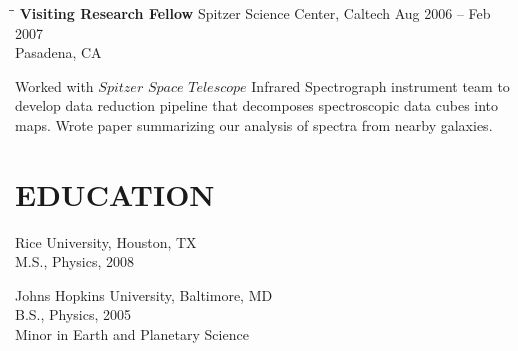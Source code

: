\documentclass{res}
\begin{document}
\begin{resume}
      \begin{tabbing}
   \hspace{2.3in}\= \hspace{2.6in}\= \kill %
    {\bf Visiting Research Fellow} \>Spitzer Science Center, Caltech \> Aug 2006 -- Feb 2007\\
                          \>Pasadena, CA
   \end{tabbing}\vspace{-20pt}
 Worked with $Spitzer$ $Space$ $Telescope$ Infrared Spectrograph instrument team to develop data reduction pipeline that decomposes spectroscopic data cubes into maps.  Wrote paper summarizing our analysis of spectra from nearby galaxies.  
  

\section{EDUCATION}
    Rice University, Houston, TX \\
    M.S., Physics, 2008
    
    Johns Hopkins University, Baltimore, MD  \\        
    B.S., Physics, 2005\\
    Minor in Earth and Planetary Science       
    

\end{resume}
\end{document}
